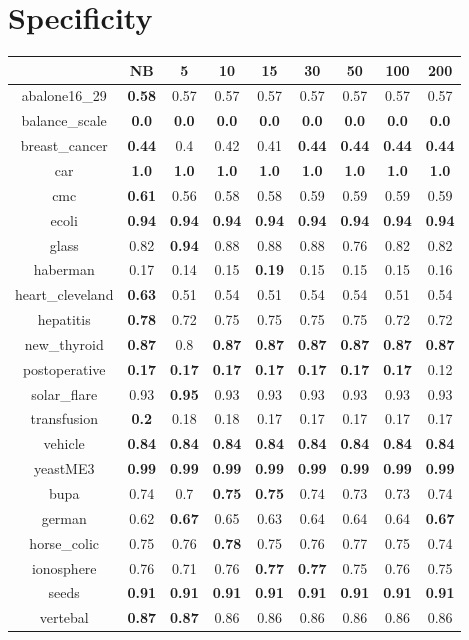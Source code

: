 \documentclass{article}%
\begin{document}
%
\section*{Specificity}%
\begin{tabular}{c|cccccccc}%
\hline%
&NB&5&10&15&30&50&100&200\\%
\hline%
abalone16\_29&\textbf{0.58}&0.57&0.57&0.57&0.57&0.57&0.57&0.57\\%
\hline%
balance\_scale&\textbf{0.0}&\textbf{0.0}&\textbf{0.0}&\textbf{0.0}&\textbf{0.0}&\textbf{0.0}&\textbf{0.0}&\textbf{0.0}\\%
\hline%
breast\_cancer&\textbf{0.44}&0.4&0.42&0.41&\textbf{0.44}&\textbf{0.44}&\textbf{0.44}&\textbf{0.44}\\%
\hline%
car&\textbf{1.0}&\textbf{1.0}&\textbf{1.0}&\textbf{1.0}&\textbf{1.0}&\textbf{1.0}&\textbf{1.0}&\textbf{1.0}\\%
\hline%
cmc&\textbf{0.61}&0.56&0.58&0.58&0.59&0.59&0.59&0.59\\%
\hline%
ecoli&\textbf{0.94}&\textbf{0.94}&\textbf{0.94}&\textbf{0.94}&\textbf{0.94}&\textbf{0.94}&\textbf{0.94}&\textbf{0.94}\\%
\hline%
glass&0.82&\textbf{0.94}&0.88&0.88&0.88&0.76&0.82&0.82\\%
\hline%
haberman&0.17&0.14&0.15&\textbf{0.19}&0.15&0.15&0.15&0.16\\%
\hline%
heart\_cleveland&\textbf{0.63}&0.51&0.54&0.51&0.54&0.54&0.51&0.54\\%
\hline%
hepatitis&\textbf{0.78}&0.72&0.75&0.75&0.75&0.75&0.72&0.72\\%
\hline%
new\_thyroid&\textbf{0.87}&0.8&\textbf{0.87}&\textbf{0.87}&\textbf{0.87}&\textbf{0.87}&\textbf{0.87}&\textbf{0.87}\\%
\hline%
postoperative&\textbf{0.17}&\textbf{0.17}&\textbf{0.17}&\textbf{0.17}&\textbf{0.17}&\textbf{0.17}&\textbf{0.17}&0.12\\%
\hline%
solar\_flare&0.93&\textbf{0.95}&0.93&0.93&0.93&0.93&0.93&0.93\\%
\hline%
transfusion&\textbf{0.2}&0.18&0.18&0.17&0.17&0.17&0.17&0.17\\%
\hline%
vehicle&\textbf{0.84}&\textbf{0.84}&\textbf{0.84}&\textbf{0.84}&\textbf{0.84}&\textbf{0.84}&\textbf{0.84}&\textbf{0.84}\\%
\hline%
yeastME3&\textbf{0.99}&\textbf{0.99}&\textbf{0.99}&\textbf{0.99}&\textbf{0.99}&\textbf{0.99}&\textbf{0.99}&\textbf{0.99}\\%
\hline%
bupa&0.74&0.7&\textbf{0.75}&\textbf{0.75}&0.74&0.73&0.73&0.74\\%
\hline%
german&0.62&\textbf{0.67}&0.65&0.63&0.64&0.64&0.64&\textbf{0.67}\\%
\hline%
horse\_colic&0.75&0.76&\textbf{0.78}&0.75&0.76&0.77&0.75&0.74\\%
\hline%
ionosphere&0.76&0.71&0.76&\textbf{0.77}&\textbf{0.77}&0.75&0.76&0.75\\%
\hline%
seeds&\textbf{0.91}&\textbf{0.91}&\textbf{0.91}&\textbf{0.91}&\textbf{0.91}&\textbf{0.91}&\textbf{0.91}&\textbf{0.91}\\%
\hline%
vertebal&\textbf{0.87}&\textbf{0.87}&0.86&0.86&0.86&0.86&0.86&0.86\\%
\hline%
\end{tabular}
\end{document}
